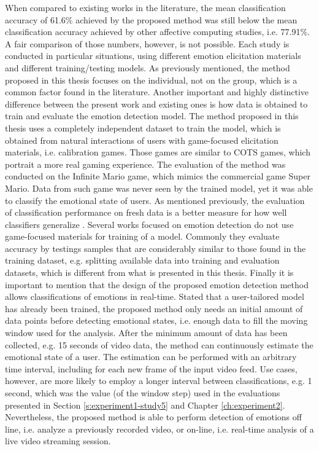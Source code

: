 When compared to existing works in the literature, the mean classification accuracy of 61.6\% achieved by the proposed method was still below the mean classification accuracy achieved by other affective computing studies, i.e. 77.91\%. A fair comparison of those numbers, however, is not possible. Each study is conducted in particular situations, using different emotion elicitation materials and different training/testing models. As previously mentioned, the method proposed in this thesis focuses on the individual, not on the group, which is a common factor found in the literature. Another important and highly distinctive difference between the present work and existing ones is how data is obtained to train and evaluate the emotion detection model. The method proposed in this thesis uses a completely independent dataset to train the model, which is obtained from natural interactions of users with game-focused elicitation materials, i.e. calibration games. Those games are similar to COTS games, which portrait a more real gaming experience. The evaluation of the method was conducted on the Infinite Mario game, which mimics the commercial game Super Mario. Data from such game was never seen by the trained model, yet it was able to classify the emotional state of users. As mentioned previously, the evaluation of classification performance on fresh data is a better measure for how well classifiers generalize \parencite[Chapter 5]{james2013introduction}. Several works focused on emotion detection do not use game-focused materials for training of a model. Commonly they evaluate accuracy by testings samples that are considerably similar to those found in the training dataset, e.g. splitting available data into training and evaluation datasets, which is different from what is presented in this thesis. Finally it is important to mention that the design of the proposed emotion detection method allows classifications of emotions in real-time. Stated that a user-tailored model has already been trained, the proposed method only needs an initial amount of data points before detecting emotional states, i.e. enough data to fill the moving window used for the analysis. After the minimum amount of data has been collected, e.g. 15 seconds of video data, the method can continuously estimate the emotional state of a user. The estimation can be performed with an arbitrary time interval, including for each new frame of the input video feed. Use cases, however, are more likely to employ a longer interval between classifications, e.g. 1 second, which was the value (of the window step) used in the evaluations presented in Section \ref{s:experiment1-study5} and Chapter \ref{ch:experiment2}. Nevertheless, the proposed method is able to perform detection of emotions off line, i.e. analyze a previously recorded video, or on-line, i.e. real-time analysis of a live video streaming session.

